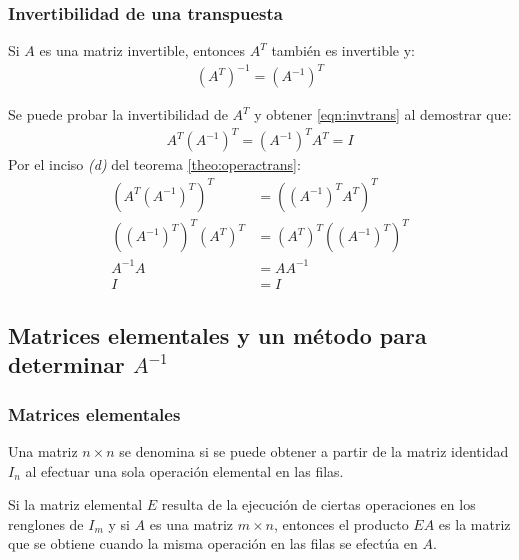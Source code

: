 \documentclass[a4paper,12pt]{article}
\begin{document}
\subsubsection{Invertibilidad de una transpuesta}

\begin{theorem}
  Si $A$ es una matriz invertible, entonces $A^T$ también es invertible y:
  \begin{align}
    \left( A^T \right)^{-1} = \left( A^{-1} \right)^T
    \label{eqn:invtrans}
  \end{align}
  \label{theo:invtrans}
\end{theorem}

\demo Se puede probar la invertibilidad de $A^T$ y obtener \eqref{eqn:invtrans}
al demostrar que:
\begin{align*}
  A^T\left( A^{-1} \right)^T = \left( A^{-1} \right)^T A^T = I
\end{align*}
Por el inciso \emph{(d)} del teorema \ref{theo:operactrans}:
\begin{align*}
  \left( A^T\left( A^{-1} \right)^T \right)^T &= \left( \left( A^{-1} \right)^T
  A^T \right)^T \\
  \left( \left( A^{-1} \right)^T \right)^T \left( A^T \right)^T &= \left( A^T
  \right)^T \left( \left( A^{-1} \right)^T \right)^T \\
  A^{-1}A &= AA^{-1} \\
  I &= I
\end{align*}


\subsection{Matrices elementales y un método para determinar $A^{-1}$}

\subsubsection{Matrices elementales}

\begin{concept}
  Una matriz $n\times n$ se denomina  si se puede obtener
  a partir de la matriz identidad $I_n$ al efectuar una sola operación
  elemental en las filas.
\end{concept}

\begin{theorem}
  Si la matriz elemental $E$ resulta de la ejecución de ciertas operaciones en
  los renglones de $I_m$ y si $A$ es una matriz $m\times n$, entonces el
  producto $EA$ es la matriz que se obtiene cuando la misma operación en las
  filas se efectúa en $A$.
  \label{theo:matr_elem}
\end{theorem}
\end{document}

